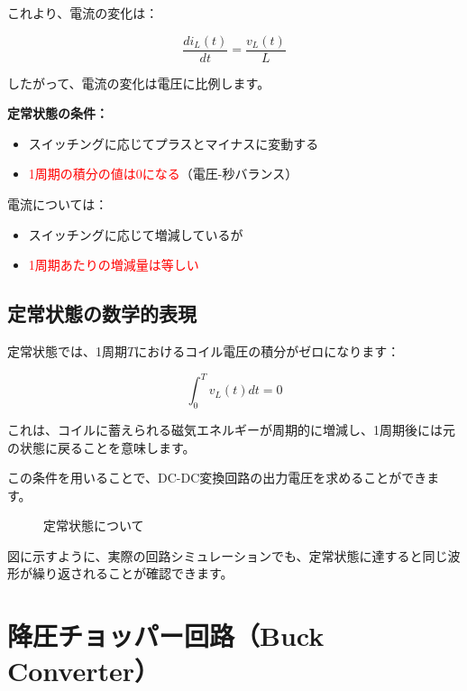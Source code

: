 これより、電流の変化は：

\begin{equation}
\frac{di_L(t)}{dt} = \frac{v_L(t)}{L}
\end{equation}

したがって、電流の変化は電圧に比例します。

\textbf{定常状態の条件：}

\begin{itemize}
\item スイッチングに応じてプラスとマイナスに変動する
\item \textcolor{red}{1周期の積分の値は0になる}（電圧-秒バランス）
\end{itemize}

電流については：

\begin{itemize}
\item スイッチングに応じて増減しているが
\item \textcolor{red}{1周期あたりの増減量は等しい}
\end{itemize}

\subsection{定常状態の数学的表現}

定常状態では、1周期$T$におけるコイル電圧の積分がゼロになります：

\begin{equation}
\int_0^T v_L(t)dt = 0
\end{equation}

これは、コイルに蓄えられる磁気エネルギーが周期的に増減し、1周期後には元の状態に戻ることを意味します。

この条件を用いることで、DC-DC変換回路の出力電圧を求めることができます。

\begin{figure}[H]
\centering
{}
\caption{定常状態について}
\label{fig:ch05_steady_state}
\end{figure}

図に示すように、実際の回路シミュレーションでも、定常状態に達すると同じ波形が繰り返されることが確認できます。

\section{降圧チョッパー回路（Buck Converter）}


